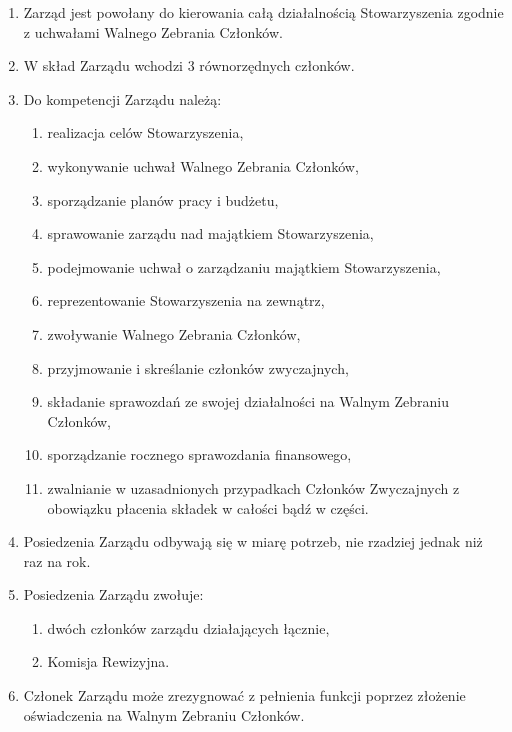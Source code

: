 \documentclass[a4paper,draft,10pt]{article}
\begin{document}
	\begin{enumerate}
	    \item Zarząd jest powołany do kierowania całą działalnością Stowarzyszenia zgodnie z uchwałami Walnego Zebrania Członków.
	    \item W skład Zarządu wchodzi 3 równorzędnych członków.
	    \item Do kompetencji Zarządu należą:
	      \begin{enumerate}
	        \item realizacja celów Stowarzyszenia,
	        \item wykonywanie uchwał Walnego Zebrania Członków,
	        \item sporządzanie planów pracy i budżetu,
	        \item sprawowanie zarządu nad majątkiem Stowarzyszenia,
	        \item podejmowanie uchwał o zarządzaniu majątkiem Stowarzyszenia,
	        \item reprezentowanie Stowarzyszenia na zewnątrz,
	        \item zwoływanie Walnego Zebrania Członków,
	        \item przyjmowanie i skreślanie członków zwyczajnych,
	        \item składanie sprawozdań ze swojej działalności na Walnym Zebraniu Członków,
	        \item sporządzanie rocznego sprawozdania finansowego,
	        \item zwalnianie w uzasadnionych przypadkach Członków Zwyczajnych z obowiązku płacenia składek w całości bądź w części.
	      \end{enumerate}
	    \item Posiedzenia Zarządu odbywają się w miarę potrzeb, nie rzadziej jednak niż raz na rok.
	    \item Posiedzenia Zarządu zwołuje:
	      \begin{enumerate}
	        \item dwóch członków zarządu działających łącznie,
	        \item Komisja Rewizyjna.
	      \end{enumerate}
	    \item Członek Zarządu może zrezygnować z pełnienia funkcji poprzez złożenie oświadczenia na Walnym Zebraniu Członków.
	\end{enumerate}
\end{document}
